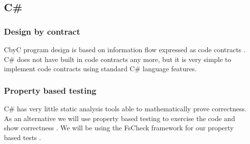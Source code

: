 \subsection{C\#}

\subsubsection{Design by contract}
CbyC program design is based on information flow expressed as code contracts 
\parencite{CbyCMan}. C\# does not have built in code contracts any more, but it
is very simple to implement code contracts using standard C\# language features.

\subsubsection{Property based testing}
C\# has very little static analysis tools able to mathematically prove correctness.
As an alternative we will use property based testing to exercise the code and show 
correctness \parencite{QuickCheck} \parencite{Hamlet94randomtesting}. We will be
using the FsCheck framework for our property based tests \parencite{FsCheck_home}.  
